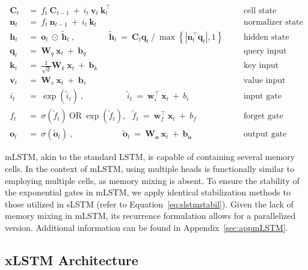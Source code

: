 \begin{align}
\label{eq:mlstm_recurrent_begin}
\mathbf{C}_t \ &= \  f_t \ \mathbf{C}_{t-1} \ + \ 
  i_t \ \mathbf{v}_t \ \mathbf{k}_t^\top & &  &\text{cell state} \\
\mathbf{n}_t \ &= \  f_t \ \mathbf{n}_{t-1} \ + \ 
  i_t \ \mathbf{k}_t & &  &\text{normalizer state} \\
\mathbf{h}_t  \ &= \ \mathbf{o}_t \ \odot \ \tilde{\mathbf{h}}_t
\ , \qquad \qquad 
\tilde{\mathbf{h}}_t \ = \   \mathbf{C}_t \mathbf{q}_t \ / \ 
  \max \left\{ |\mathbf{n}_t^\top \mathbf{q}_t|, 1 \right\} 
   &&&\text{hidden state} \\
\mathbf{q}_t \ &= \ \mathbf{W}_q \ \mathbf{x}_t \ + \ \mathbf{b}_q  & &  &\text{query input} \\
\mathbf{k}_t \ &= \ \frac{1}{\sqrt{d}} \mathbf{W}_k \ \mathbf{x}_t \ + \ \mathbf{b}_k  & &  &\text{key input} \\
\mathbf{v}_t \ &= \ \mathbf{W}_v \ \mathbf{x}_t \ + \ \mathbf{b}_v  & &  &\text{value input} \\
i_t \ &= \ \!\exp \!  \! \left( \tilde{i}_t  \right) \ , 
 \qquad \qquad \ \ \ \ \,
  \tilde{i}_t \ = \ \mathbf{w}^\top_{i} \ \mathbf{x}_t \ + \  b_{i} \ \ \ 
  &&&\text{input gate} \\
f_t \ &= \ \sigma \!  \left(  \tilde{f}_t \right) \ \text{OR} \ \!\exp \!  \! \left(  \tilde{f}_t \right) , \ \ \: \!
\tilde{f}_t \ = \ \mathbf{w}^\top_{f} \ \mathbf{x}_t  \ + \
  b_{f}
  &&& \text{forget gate} \\
\label{eq:mlstm_recurrent_end}
\mathbf{o}_t \ &= \ \sigma \left( \tilde{\mathbf{o}}_t \right) \ , \qquad \qquad \quad \ \ \ \,
  \tilde{\mathbf{o}}_t  \ = \ \mathbf{W}_{\mathbf{o}} \ \mathbf{x}_t \ + \
  \mathbf{b}_{\mathbf{o}}
  &&&\text{output gate} 
\end{align}

mLSTM, akin to the standard LSTM, is capable of containing several memory cells. In the context of mLSTM, using multiple heads is functionally similar to employing multiple cells, as memory mixing is absent. To ensure the stability of the exponential gates in mLSTM, we apply identical stabilization methods to those utilized in sLSTM (refer to Equation~\ref{eq:slstmstabil}). Given the lack of memory mixing in mLSTM, its recurrence formulation allows for a parallelized version. Additional information can be found in Appendix~\ref{sec:appmLSTM}.

\subsection{xLSTM Architecture}
\label{sec:xLSTMarch}

